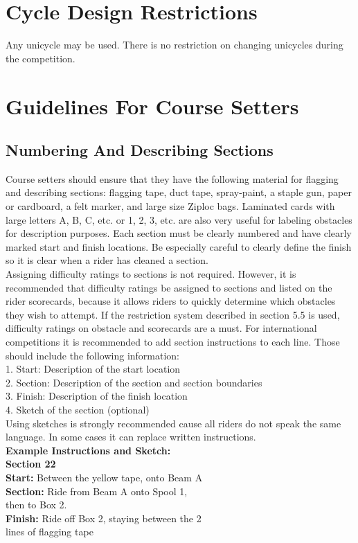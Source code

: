 \section{Cycle Design Restrictions}
Any unicycle may be used. There is no restriction on changing unicycles during the competition.
\section{Guidelines For Course Setters}
\subsection{Numbering And Describing Sections}
Course setters should ensure that they have the following material for flagging and describing sections: flagging tape,
duct tape, spray-paint, a staple gun, paper or cardboard, a felt marker, and large size Ziploc bags. Laminated cards with
large letters A, B, C, etc. or 1, 2, 3, etc. are also very useful for labeling obstacles for description purposes.
Each section must be clearly numbered and have clearly marked start and finish locations. Be especially careful to
clearly define the finish so it is clear when a rider has cleaned a section.\\
Assigning difficulty ratings to sections is not required. However, it is recommended that difficulty ratings be assigned
to sections and listed on the rider scorecards, because it allows riders to quickly determine which obstacles they wish to
attempt. If the restriction system described in section 5.5 is used, difficulty ratings on obstacle and scorecards are a
must. For international competitions it is recommended to add section instructions to each line. Those should include
the following information:\\
1. Start: Description of the start location\\
2. Section: Description of the section and section boundaries\\
3. Finish: Description of the finish location\\
4. Sketch of the section (optional)\\
Using sketches is strongly recommended cause all riders do not speak the same language. In some cases it can replace written instructions.\\
\textbf{Example Instructions and Sketch:}\\
\textbf{Section 22}\\
\textbf{Start:} Between the yellow tape, onto Beam A\\
\textbf{Section:} Ride from Beam A onto Spool 1,\\
then to Box 2.\\
\textbf{Finish:} Ride off Box 2, staying between the 2\\
lines of flagging tape\\
	
